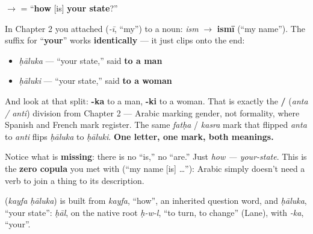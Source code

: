 $\to$ \textbf{ } = \textquotedblleft{}\textbf{how} {[}is{]} \textbf{your state}?\textquotedblright{}

\begin{grammarlens}[title={Grammar Lens — The suffix you already half-know}]
In Chapter 2 you attached \textbf{} (\emph{-ī}, \textquotedblleft{}my\textquotedblright{}) to a noun: \emph{ism} $\to$ \textbf{ismī} (\textquotedblleft{}my name\textquotedblright{}). The suffix for \textquotedblleft{}\textbf{your}\textquotedblright{} works \textbf{identically} — it just clips onto the end:

\begin{itemize}
\raggedright
  \item \textbf{} \emph{ḥāluka} — \textquotedblleft{}your state,\textquotedblright{} said \textbf{to a man}
  \item \textbf{} \emph{ḥāluki} — \textquotedblleft{}your state,\textquotedblright{} said \textbf{to a woman}
\end{itemize}

And look at that split: \textbf{-ka} to a man, \textbf{-ki} to a woman. That is exactly the \textbf{ / } (\emph{anta / anti}) division from Chapter 2 — Arabic marking gender, not formality, where Spanish and French mark register. The same \emph{fatḥa} / \emph{kasra} mark that flipped \emph{anta} to \emph{anti} flips \emph{ḥāluka} to \emph{ḥāluki}. \textbf{One letter, one mark, both meanings.}
\end{grammarlens}

\begin{grammarlens}[title={Grammar Lens — No verb at all}]
Notice what is \textbf{missing}: there is no \textquotedblleft{}is,\textquotedblright{} no \textquotedblleft{}are.\textquotedblright{} Just \emph{how — your-state}. This is the \textbf{zero copula} you met with \textbf{} (\textquotedblleft{}my name {[}is{]} …\textquotedblright{}): Arabic simply doesn't need a verb to join a thing to its description.
\end{grammarlens}

\begin{cousinweb}
\textbf{ } (\emph{kayfa ḥāluka}) is built from \emph{kayfa}, \textquotedblleft{}how\textquotedblright{}, an inherited question word, and \emph{ḥāluka}, \textquotedblleft{}your state\textquotedblright{}: \emph{ḥāl}, on the native root \emph{ḥ-w-l}, \textquotedblleft{}to turn, to change\textquotedblright{} (Lane), with \emph{-ka}, \textquotedblleft{}your\textquotedblright{}.
\end{cousinweb}

